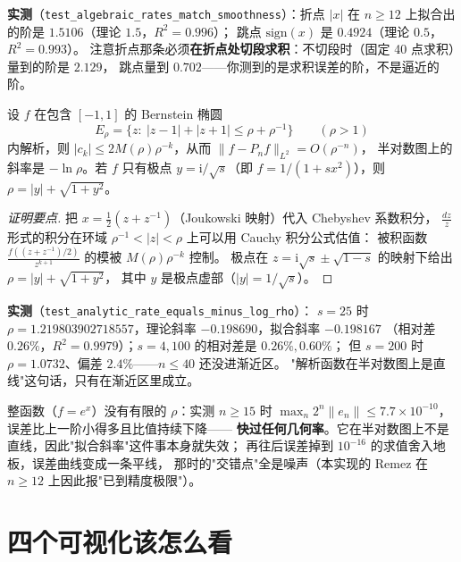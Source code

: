\textbf{实测}（\texttt{test\_algebraic\_rates\_match\_smoothness}）：折点 $|x|$
在 $n\ge12$ 上拟合出的阶是 $1.5106$（理论 $1.5$，$R^2=0.996$）；
跳点 $\mathrm{sign}(x)$ 是 $0.4924$（理论 $0.5$，$R^2=0.993$）。
注意折点那条必须\textbf{在折点处切段求积}：不切段时（固定 40 点求积）量到的阶是 $2.129$，
跳点量到 $0.702$——你测到的是求积误差的阶，不是逼近的阶。

\begin{theorem}
\label{thm:geometric}
设 $f$ 在包含 $[-1,1]$ 的 Bernstein 椭圆
\[
  E_\rho=\{z:\ |z-1|+|z+1|\le\rho+\rho^{-1}\}\qquad(\rho>1)
\]
内解析，则 $|c_k|\le 2M(\rho)\rho^{-k}$，从而 $\|f-P_nf\|_{L^2}=O(\rho^{-n})$，
半对数图上的斜率是 $-\ln\rho$。若 $f$ 只有极点 $y=\mathrm{i}/\sqrt{s}$（即
$f=1/(1+sx^2)$），则 $\rho=|y|+\sqrt{1+y^2}$。
\end{theorem}

\begin{proof}[证明要点]
把 $x=\frac12(z+z^{-1})$（Joukowski 映射）代入 Chebyshev 系数积分，
$\frac{dz}{z}$ 形式的积分在环域 $\rho^{-1}<|z|<\rho$ 上可以用 Cauchy 积分公式估值：
被积函数 $\frac{f((z+z^{-1})/2)}{z^{k+1}}$ 的模被 $M(\rho)\rho^{-k}$ 控制。
极点在 $z=\mathrm{i}\sqrt s\pm\sqrt{1-s}$ 的映射下给出 $\rho=|y|+\sqrt{1+y^2}$，
其中 $y$ 是极点虚部（$|y|=1/\sqrt s$）。
\end{proof}

\textbf{实测}（\texttt{test\_analytic\_rate\_equals\_minus\_log\_rho}）：
$s=25$ 时 $\rho=1.219803902718557$，理论斜率 $-0.198690$，拟合斜率 $-0.198167$
（相对差 $0.26\%$，$R^2=0.9979$）；$s=4,100$ 的相对差是 $0.26\%,0.60\%$；
但 $s=200$ 时 $\rho=1.0732$、偏差 $2.4\%$——$n\le40$ 还没进渐近区。
"解析函数在半对数图上是直线"这句话，只有在渐近区里成立。

整函数（$f=e^x$）没有有限的 $\rho$：实测 $n\ge15$ 时
$\max_n 2^n\|e_n\|\le7.7\times10^{-10}$，误差比上一阶小得多且比值持续下降——
\textbf{快过任何几何率}。它在半对数图上不是直线，因此"拟合斜率"这件事本身就失效；
再往后误差掉到 $10^{-16}$ 的求值舍入地板，误差曲线变成一条平线，
那时的"交错点"全是噪声（本实现的 Remez 在 $n\ge12$ 上因此报"已到精度极限"）。

\section{四个可视化该怎么看}

